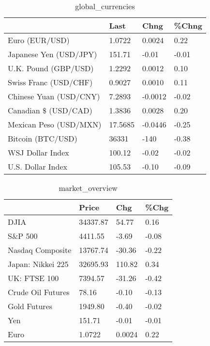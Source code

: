 \documentclass{article}%
\begin{document}
%


\begin{table}[htbp]%
\caption{global\_currencies}%
\centering%
\begin{adjustbox}{width=1\textwidth}%
\begin{tabular}{llll}
\toprule
                       &    Last &    Chng & \%Chng \\
\midrule
        Euro (EUR/USD) &  1.0722 &  0.0024 &  0.22 \\
Japanese Yen (USD/JPY) &  151.71 &   -0.01 & -0.01 \\
  U.K. Pound (GBP/USD) &  1.2292 &  0.0012 &  0.10 \\
 Swiss Franc (USD/CHF) &  0.9027 &  0.0010 &  0.11 \\
Chinese Yuan (USD/CNY) &  7.2893 & -0.0012 & -0.02 \\
  Canadian \$ (USD/CAD) &  1.3836 &  0.0028 &  0.20 \\
Mexican Peso (USD/MXN) & 17.5685 & -0.0446 & -0.25 \\
     Bitcoin (BTC/USD) &   36331 &    -140 & -0.38 \\
      WSJ Dollar Index &  100.12 &   -0.02 & -0.02 \\
     U.S. Dollar Index &  105.53 &   -0.10 & -0.09 \\
\bottomrule
\end{tabular}
%
\end{adjustbox}%
\end{table}

%


\begin{table}[htbp]%
\caption{market\_overview}%
\centering%
\begin{adjustbox}{width=1\textwidth}%
\begin{tabular}{llll}
\toprule
                  &    Price &    Chg &  \%Chg \\
\midrule
             DJIA & 34337.87 &  54.77 &  0.16 \\
          S\&P 500 &  4411.55 &  -3.69 & -0.08 \\
 Nasdaq Composite & 13767.74 & -30.36 & -0.22 \\
Japan: Nikkei 225 & 32695.93 & 110.82 &  0.34 \\
     UK: FTSE 100 &  7394.57 & -31.26 & -0.42 \\
Crude Oil Futures &    78.16 &  -0.10 & -0.13 \\
     Gold Futures &  1949.80 &  -0.40 & -0.02 \\
              Yen &   151.71 &  -0.01 & -0.01 \\
             Euro &   1.0722 & 0.0024 &  0.22 \\
\bottomrule
\end{tabular}
%
\end{adjustbox}%
\end{table}

%
\end{document}
